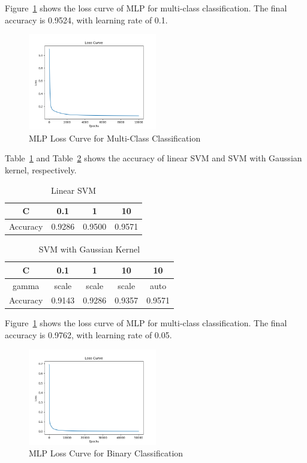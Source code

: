 \documentclass{article}
\begin{document}
Figure~\ref{Figure 3} shows the loss curve of MLP for multi-class classification. The final accuracy is 0.9524, with learning rate of 0.1.

\begin{figure}[H]
    \centering
    \includegraphics[width=0.5\textwidth]{mcmlp.png}
    \caption{MLP Loss Curve for Multi-Class Classification}
    \label{Figure 3}
\end{figure}

Table~\ref{Table 2} and Table~\ref{Table 3} shows the accuracy of linear SVM and SVM with Gaussian kernel, respectively.

\begin{table}[H]
    \centering
    \begin{tabular}{|c|c|c|c|}\hline
        C&0.1&1&10\\ \hline
        Accuracy&0.9286&0.9500&0.9571\\ \hline    
    \end{tabular}
    \caption{Linear SVM}
    \label{Table 2}
\end{table}

\begin{table}[H]
    \centering
    \begin{tabular}{|c|c|c|c|c|}\hline
        C&0.1&1&10&10\\ \hline
        gamma&scale&scale&scale&auto\\ \hline 
        Accuracy&0.9143&0.9286&0.9357&0.9571\\ \hline   
    \end{tabular}
    \caption{SVM with Gaussian Kernel}
    \label{Table 3}    
\end{table}

Figure~\ref{Figure 3} shows the loss curve of MLP for multi-class classification. The final accuracy is 0.9762, with learning rate of 0.05.

\begin{figure}[H]
    \centering
    \includegraphics[width=0.5\textwidth]{BMLP.png}
    \caption{MLP Loss Curve for Binary Classification}
    \label{Figure 4}
\end{figure}
\end{document}
